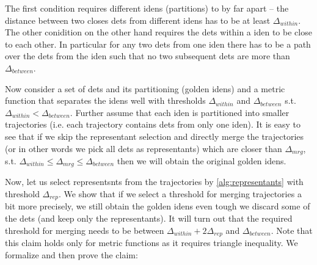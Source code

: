 The first condition requires different \glspl{iden} (partitions) to by far apart -- the distance between two closes \glspl{det} from different \glspl{iden} has to be at least $\Delta_{within}$. The other conidition on the other hand requires the \glspl{det} within a \gls{iden} to be close to each other. In particular for any two \glspl{det} from one \gls{iden} there has to be a path over the \glspl{det} from the \gls{iden} such that no two subsequent \glspl{det} are more than $\Delta_{between}$.

Now consider a set of \glspl{det} and its partitioning (golden \glspl{iden}) and a metric function that separates the \glspl{iden} well with thresholds $\Delta_{within}$ and $\Delta_{between}$ s.t. $\Delta_{within} < \Delta_{between}$. Further assume that each \gls{iden} is partitioned into smaller trajectories (i.e. each trajectory contains \glspl{det} from only one \gls{iden}). It is easy to see that if we skip the representant selection and directly merge the trajectories (or in other words we pick all \glspl{det} as representants) which are closer than $\Delta_{mrg}$, s.t. $\Delta_{within} \leq \Delta_{mrg} \leq \Delta_{between}$ then we will obtain the original golden \glspl{iden}.

Now, let us select representsnts from the trajectories by \autoref{alg:representants} with threshold $\Delta_{rep}$. We show that if we select a threshold for merging trajectories a bit more precisely, we still obtain the golden \glspl{iden} even tough we discard some of the \glspl{det} (and keep only the representants). It will turn out that the required threshold for merging needs to be between $\Delta_{within} + 2\Delta_{rep}$ and $\Delta_{between}$. Note that this claim holds only for metric functions as it requires triangle inequality. We formalize and then prove the claim:



